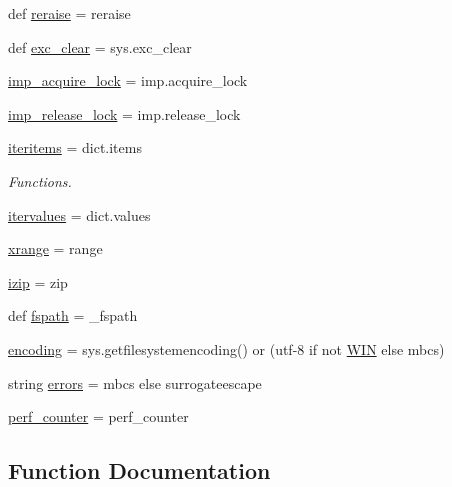 \begin{DoxyCompactItemize}
\item 
def \hyperlink{namespacegevent_1_1__compat_aff9b7c113467e5138ec6665fc6e96739}{reraise} = reraise
\item 
def \hyperlink{namespacegevent_1_1__compat_a0ad83ad0e9d4f7dfc80dc8b7d880429b}{exc\+\_\+clear} = sys.\+exc\+\_\+clear
\item 
\hyperlink{namespacegevent_1_1__compat_a944429ef95c4ca09ad27c8994361963e}{imp\+\_\+acquire\+\_\+lock} = imp.\+acquire\+\_\+lock
\item 
\hyperlink{namespacegevent_1_1__compat_aba43f7fa3eb1665fc4dc90566735add3}{imp\+\_\+release\+\_\+lock} = imp.\+release\+\_\+lock
\item 
\hyperlink{namespacegevent_1_1__compat_a1e84d240428e060258f93c34977b1d13}{iteritems} = dict.\+items
\begin{DoxyCompactList}\small\item\em Functions. \end{DoxyCompactList}\item 
\hyperlink{namespacegevent_1_1__compat_af63382a9c95ead77adf6c3b7305dabee}{itervalues} = dict.\+values
\item 
\hyperlink{namespacegevent_1_1__compat_a36b3d07c411c08f23bdf22f791a366fa}{xrange} = range
\item 
\hyperlink{namespacegevent_1_1__compat_af2f0d5be97491e26839022db0f01a7e5}{izip} = zip
\item 
def \hyperlink{namespacegevent_1_1__compat_a6ccd0d768303d89d43fee88e64c3836a}{fspath} = \+\_\+fspath
\item 
\hyperlink{namespacegevent_1_1__compat_a19f76a3ed005a53efa7c1b355bc6924d}{encoding} = sys.\+getfilesystemencoding() or (\textquotesingle{}utf-\/8\textquotesingle{} if not \hyperlink{namespacegevent_1_1__compat_a887be9cbf2ddbbf113adcdec314f4438}{W\+IN} else \textquotesingle{}mbcs\textquotesingle{})
\item 
string \hyperlink{namespacegevent_1_1__compat_aead37f1bc4f22b4a2fd7ebc324289618}{errors} = \textquotesingle{}mbcs\textquotesingle{} else \textquotesingle{}surrogateescape\textquotesingle{}
\item 
\hyperlink{namespacegevent_1_1__compat_aa416ad7c87475a5a7fc3d914a0af6ec7}{perf\+\_\+counter} = perf\+\_\+counter
\end{DoxyCompactItemize}


\subsection{Function Documentation}
\mbox{\label{namespacegevent_1_1__compat_a50c20e8d50f8dbbc53fecc5beb05b37f}} 
